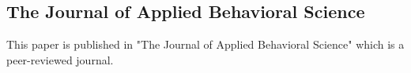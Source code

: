 
\subsection{The Journal of Applied Behavioral Science}

This paper is published in "The Journal of Applied Behavioral Science" which is a peer-reviewed journal.\\

